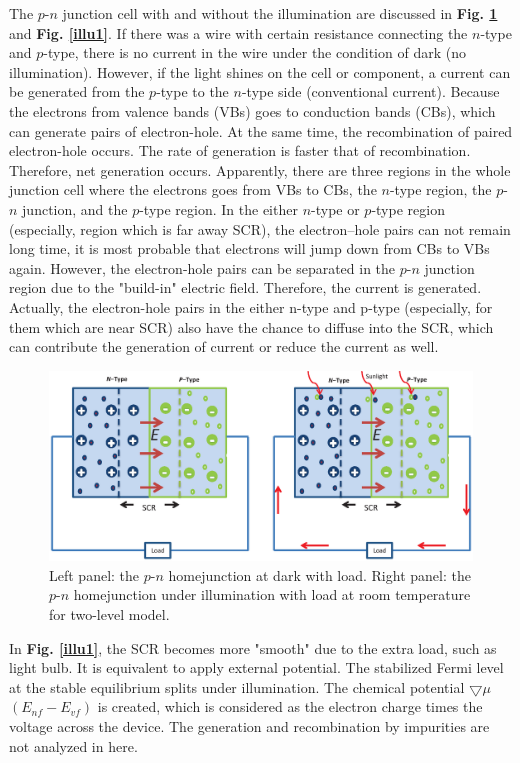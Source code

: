 \documentclass[a4paper, 12pt, titlepage,oneside,drop]{kthesis}
\begin{document}
The $p$-$n$ junction cell with and without the illumination are discussed in \textbf{Fig. \ref{illu}} and \textbf{Fig. \ref{illu1}}. If there was a wire with certain resistance connecting 
the $n$-type and $p$-type, there is no current in the wire under the condition of dark (no illumination). However, if the light shines on the cell or component, a current can be generated from the $p$-type
to the $n$-type side (conventional current). Because the electrons from valence bands (VBs) goes to conduction bands (CBs), which can generate pairs of electron-hole. At the same time, the recombination of paired electron-hole occurs. The rate of generation 
is faster that of recombination. Therefore, net generation occurs. Apparently, there are three regions in the whole junction cell where the electrons goes from VBs to CBs, the $n$-type region, the $p$-$n$
junction, and the $p$-type region. In the either $n$-type or $p$-type region (especially, region which is far away SCR), the electron–hole pairs can not remain long time,  it is most probable that electrons
will jump down from CBs to VBs again. However, the electron-hole pairs can be separated in the $p$-$n$ junction region due to the "build-in" electric field. Therefore, the current is generated. Actually, the electron-hole pairs in the either n-type and p-type 
(especially, for them which are near SCR) also have the chance to diffuse into the SCR, which can contribute the generation of current or reduce the current as well.

\begin{figure}[H]
\centering
\includegraphics[scale=0.5]{illumination.eps}
\caption{Left panel: the $p$-$n$ homejunction at dark with load. Right panel: the $p$-$n$ homejunction under illumination with load at room temperature for two-level model.}
\label{illu}
\end{figure}

In \textbf{Fig. \ref{illu1}}, the SCR becomes more "smooth" due to the extra load, such as light bulb. It is equivalent to apply external potential. The stabilized Fermi level at the stable equilibrium splits under illumination.
The chemical potential $\bigtriangledown \mu$ $(E_{nf} - E_{vf})$ is created, which is considered as the electron charge times the voltage across the device. The generation and recombination by impurities are not analyzed in here.
\end{document}
